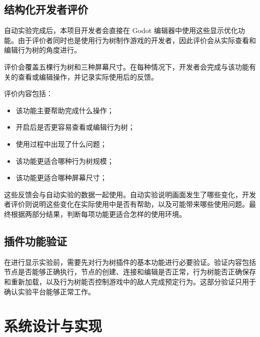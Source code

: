 \documentclass[11pt,a4paper,oneside,extrafontsizes]{memoir}
\begin{document}
\section{结构化开发者评价}

自动实验完成后，本项目开发者会直接在 Godot 编辑器中使用这些显示优化功能。由于评价者同时也是使用行为树制作游戏的开发者，因此评价会从实际查看和编辑行为树的角度进行。

评价会覆盖五棵行为树和三种屏幕尺寸。在每种情况下，开发者会完成与该功能有关的查看或编辑操作，并记录实际使用后的反馈。

评价内容包括：

\begin{itemize}[leftmargin=*]
\item 该功能主要帮助完成什么操作；
\end{itemize}

\begin{itemize}[leftmargin=*]
\item 开启后是否更容易查看或编辑行为树；
\end{itemize}

\begin{itemize}[leftmargin=*]
\item 使用过程中出现了什么问题；
\end{itemize}

\begin{itemize}[leftmargin=*]
\item 该功能更适合哪种行为树规模；
\end{itemize}

\begin{itemize}[leftmargin=*]
\item 该功能更适合哪种屏幕尺寸；
\end{itemize}

这些反馈会与自动实验的数据一起使用。自动实验说明画面发生了哪些变化，开发者评价则说明这些变化在实际使用中是否有帮助，以及可能带来哪些使用问题。最终根据两部分结果，判断每项功能更适合怎样的使用环境。

\section{插件功能验证}

在进行显示实验前，需要先对行为树插件的基本功能进行必要验证。验证内容包括节点是否能够正确执行，节点的创建、连接和编辑是否正常，行为树能否正确保存和重新加载，以及行为树能否控制游戏中的敌人完成预定行为。这部分验证只用于确认实验平台能够正常工作。

\chapter{系统设计与实现}
\end{document}
